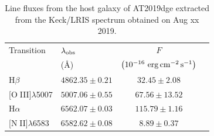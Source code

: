 \documentclass[twocolumn]{aastex63}
\def\ion#1#2{#1$\;${\footnotesize\rm{#2}}\relax}
\begin{document}
\begin{CJK*}{UTF8}{gbsn}
\begin{table}[htbp!]
	\caption{Line fluxes from the host galaxy of AT2019dge extracted from the Keck/LRIS spectrum 
	obtained on Aug xx 2019. }\label{tab:eml_host}
	\centering
	\begin{tabular}{llcc}
		\toprule
		Transition			& $\lambda_{\rm obs}$& $F$	\\
		& (\AA)	& $\left(10^{-16}~{\rm erg\,cm}^{-2}\,{\rm s}^{-1}\right) $ \\
		\midrule
		H$\beta$								& $ 4862.35 \pm 0.21	$ &$	32.45 \pm 2.08		$\\%
		{[\ion{O}{III}]}$\lambda$5007				& $5007.06 \pm 0.55$ &$67.56 \pm 13.52	$\\%
		H$\alpha$								&$6562.07 	\pm 0.03$   & $115.79 \pm 1.16	$\\%
		{[\ion{N}{II}]}$\lambda$6583				& $6582.62 \pm 0.08$ &$	8.89 \pm 0.37	$\\%
		\bottomrule
	\end{tabular}
\end{table}


\end{CJK*}
\end{document}
